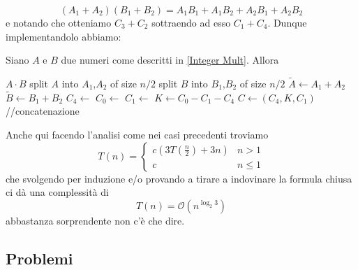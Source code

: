\documentclass[11pt]{scrartcl}
\newcommand{\bigo}{\mathcal{O}}
\begin{document}
	$$(A_1+A_2)(B_1+B_2)=A_1B_1+A_1B_2+A_2B_1+A_2B_2$$
	e notando che otteniamo $C_3+C_2$ sottraendo ad esso $C_1+C_4$. Dunque implementandolo abbiamo:
	\begin{algorithm}
		Siano $A$ e $B$ due numeri come descritti in \ref{Integer Mult}. Allora
		\begin{algorithmic}[1]
			\State \Return $A\cdot B$
			\EndIf
			\State split $A$ into $A_1$,$A_2$ of size $n/2$
			\State split $B$ into $B_1$,$B_2$ of size $n/2$
			\State $\tilde{A} \gets A_1+A_2$
			\State $\tilde{B} \gets B_1+B_2$
			\State $C_4\gets$
			\State $C_0\gets$
			\State $C_1\gets$
			\State $K \gets C_0-C_1-C_4$
			\State $C\gets(C_4,K,C_1)$ \qquad //concatenazione
			\EndFunction
		\end{algorithmic} 
	\end{algorithm}
	Anche qui facendo l'analisi come nei casi precedenti troviamo
	$$T(n)=
	\begin{cases}
		c\left(3T\left(\frac{n}{2}\right)+3n\right) & n>1 \\
		c & n\le 1
	\end{cases}
	$$
	che svolgendo per induzione e/o provando a tirare a indovinare la formula chiusa ci dà una complessità di 
	$$T(n)=\bigo\left(n^{\log_2{3}}\right)$$
	abbastanza sorprendente non c'è che dire.
	
	\subsection{Problemi}
	
\end{document}
